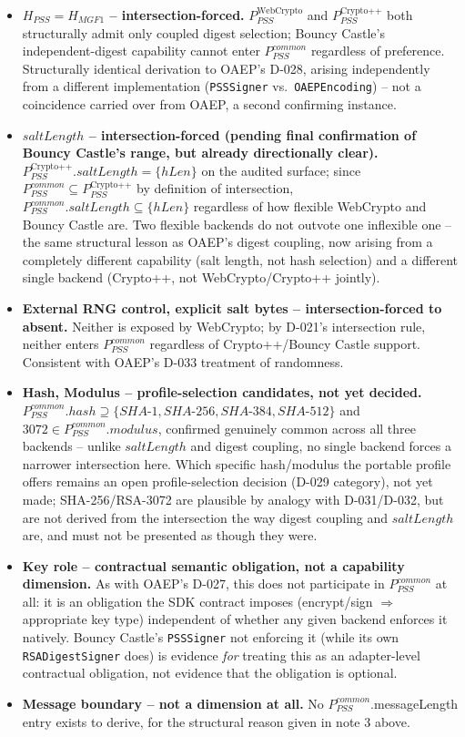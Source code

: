 \documentclass[11pt,a4paper]{article}
\begin{document}
\begin{itemize}
\item \textbf{$H_{PSS} = H_{MGF1}$ -- intersection-forced.} $P_{PSS}^{\text{WebCrypto}}$ and $P_{PSS}^{\text{Crypto++}}$ both structurally admit only coupled digest selection; Bouncy Castle's independent-digest capability cannot enter $P_{PSS}^{common}$ regardless of preference. Structurally identical derivation to OAEP's D-028, arising independently from a different implementation (\texttt{PSSSigner} vs.\ \texttt{OAEPEncoding}) -- not a coincidence carried over from OAEP, a second confirming instance.
\item \textbf{$saltLength$ -- intersection-forced (pending final confirmation of Bouncy Castle's range, but already directionally clear).} $P_{PSS}^{\text{Crypto++}}.saltLength = \{hLen\}$ on the audited surface; since $P_{PSS}^{common} \subseteq P_{PSS}^{\text{Crypto++}}$ by definition of intersection, $P_{PSS}^{common}.saltLength \subseteq \{hLen\}$ regardless of how flexible WebCrypto and Bouncy Castle are. Two flexible backends do not outvote one inflexible one -- the same structural lesson as OAEP's digest coupling, now arising from a completely different capability (salt length, not hash selection) and a different single backend (Crypto++, not WebCrypto/Crypto++ jointly).
\item \textbf{External RNG control, explicit salt bytes -- intersection-forced to absent.} Neither is exposed by WebCrypto; by D-021's intersection rule, neither enters $P_{PSS}^{common}$ regardless of Crypto++/Bouncy Castle support. Consistent with OAEP's D-033 treatment of randomness.
\item \textbf{Hash, Modulus -- profile-selection candidates, not yet decided.} $P_{PSS}^{common}.hash \supseteq \{SHA\text{-}1, SHA\text{-}256, SHA\text{-}384, SHA\text{-}512\}$ and $3072 \in P_{PSS}^{common}.modulus$, confirmed genuinely common across all three backends -- unlike $saltLength$ and digest coupling, no single backend forces a narrower intersection here. Which specific hash/modulus the portable profile offers remains an open profile-selection decision (D-029 category), not yet made; SHA-256/RSA-3072 are plausible by analogy with D-031/D-032, but are not derived from the intersection the way digest coupling and $saltLength$ are, and must not be presented as though they were.
\item \textbf{Key role -- contractual semantic obligation, not a capability dimension.} As with OAEP's D-027, this does not participate in $P_{PSS}^{common}$ at all: it is an obligation the SDK contract imposes (encrypt/sign $\Rightarrow$ appropriate key type) independent of whether any given backend enforces it natively. Bouncy Castle's \texttt{PSSSigner} not enforcing it (while its own \texttt{RSADigestSigner} does) is evidence \emph{for} treating this as an adapter-level contractual obligation, not evidence that the obligation is optional.
\item \textbf{Message boundary -- not a dimension at all.} No $P_{PSS}^{common}$.messageLength entry exists to derive, for the structural reason given in note 3 above.
\end{itemize}
\end{document}
